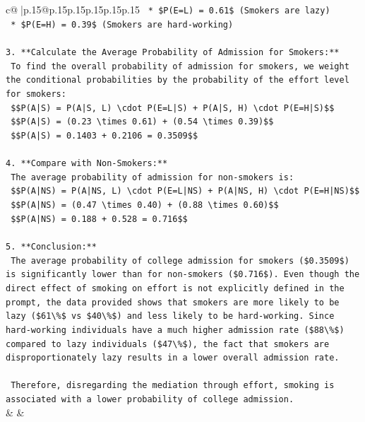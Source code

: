 \documentclass{article}
\begin{document}
{\begin{supertabular}{c@{$\;$}|p{.15\linewidth}@{}p{.15\linewidth}p{.15\linewidth}p{.15\linewidth}p{.15\linewidth}p{.15\linewidth}}
{{{\texttt{    *   \$P(E=L) = 0.61\$ (Smokers are lazy)} \\
\texttt{    *   \$P(E=H) = 0.39\$ (Smokers are hard{-}working)} \\
\\ 
\texttt{3.  **Calculate the Average Probability of Admission for Smokers:**} \\
\texttt{    To find the overall probability of admission for smokers, we weight the conditional probabilities by the probability of the effort level for smokers:} \\
\texttt{    \$\$P(A|S) = P(A|S, L) \textbackslash{}cdot P(E=L|S) + P(A|S, H) \textbackslash{}cdot P(E=H|S)\$\$} \\
\texttt{    \$\$P(A|S) = (0.23 \textbackslash{}times 0.61) + (0.54 \textbackslash{}times 0.39)\$\$} \\
\texttt{    \$\$P(A|S) = 0.1403 + 0.2106 = 0.3509\$\$} \\
\\ 
\texttt{4.  **Compare with Non{-}Smokers:**} \\
\texttt{    The average probability of admission for non{-}smokers is:} \\
\texttt{    \$\$P(A|NS) = P(A|NS, L) \textbackslash{}cdot P(E=L|NS) + P(A|NS, H) \textbackslash{}cdot P(E=H|NS)\$\$} \\
\texttt{    \$\$P(A|NS) = (0.47 \textbackslash{}times 0.40) + (0.88 \textbackslash{}times 0.60)\$\$} \\
\texttt{    \$\$P(A|NS) = 0.188 + 0.528 = 0.716\$\$} \\
\\ 
\texttt{5.  **Conclusion:**} \\
\texttt{    The average probability of college admission for smokers (\$0.3509\$) is significantly lower than for non{-}smokers (\$0.716\$). Even though the direct effect of smoking on effort is not explicitly defined in the prompt, the data provided shows that smokers are more likely to be lazy (\$61\textbackslash{}\%\$ vs \$40\textbackslash{}\%\$) and less likely to be hard{-}working. Since hard{-}working individuals have a much higher admission rate (\$88\textbackslash{}\%\$) compared to lazy individuals (\$47\textbackslash{}\%\$), the fact that smokers are disproportionately lazy results in a lower overall admission rate.} \\
\\ 
\texttt{    Therefore, disregarding the mediation through effort, smoking is associated with a lower probability of college admission.} \\
            }
        }
    }
    & & \\ \\


\end{supertabular}}
\end{document}
